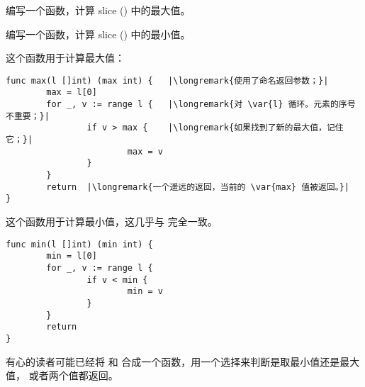 \begin{Exercise}[title={最小值和最大值},difficulty=3]
\label{ex:minmax}
\Question\label{ex:minmax q1} 编写一个函数，计算  slice () 中的最大值。

\Question\label{ex:minmax q2} 编写一个函数，计算  slice () 中的最小值。

\end{Exercise}

\begin{Answer}
\Question 这个函数用于计算最大值：
\begin{lstlisting}
func max(l []int) (max int) {   |\longremark{使用了命名返回参数；}|
        max = l[0]      
        for _, v := range l {   |\longremark{对 \var{l} 循环。元素的序号不重要；}|
                if v > max {    |\longremark{如果找到了新的最大值，记住它；}|
                        max = v 
                }   
        }   
        return  |\longremark{一个遥远的返回，当前的 \var{max} 值被返回。}|
}
\end{lstlisting}
\showremarks

\Question 这个函数用于计算最小值，这几乎与  完全一致。
\begin{lstlisting}
func min(l []int) (min int) {
        min = l[0]
        for _, v := range l { 
                if v < min {
                        min = v 
                }   
        }   
        return
}
\end{lstlisting}
有心的读者可能已经将  和  合成一个函数，用一个选择来判断是取最小值还是最大值，
或者两个值都返回。
\end{Answer}
